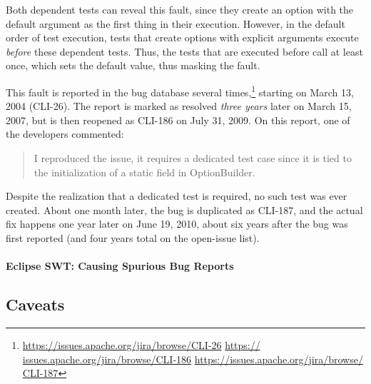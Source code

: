 Both dependent tests
can reveal this fault, since they create an option with 
the default argument as the first thing in their execution. However,
in the default order of test execution, 
tests that create options with explicit arguments execute \emph{before} 
these dependent tests.
Thus, the tests that are executed before call  at least once, which
sets the default  value, thus masking the fault.


This fault is reported in the bug
database several times,\footnote{\url{https://issues.apache.org/jira/browse/CLI-26} \url{https://
issues.apache.org/jira/browse/CLI-186} \url{https://issues.apache.org/jira/browse/
CLI-187}} starting on March 13, 2004 (CLI-26). The report is marked as resolved
\emph{three years} later on March 15, 2007, but is then reopened as CLI-186 on
July 31, 2009. On this report, one of the developers commented:
\begin{quote}
I reproduced the issue, it requires a dedicated test case since it is tied to the initialization 
of a static field in OptionBuilder.
\end{quote}
Despite the realization that a dedicated test is required, no such
test was ever created.
About one month later, the bug is duplicated as CLI-187, and the
actual fix happens one 
year later on June 19, 2010, about six years after the bug was first reported (and four years
total on the open-issue list).


\paragraph{Eclipse SWT: Causing Spurious Bug Reports}



\subsection{Caveats}

